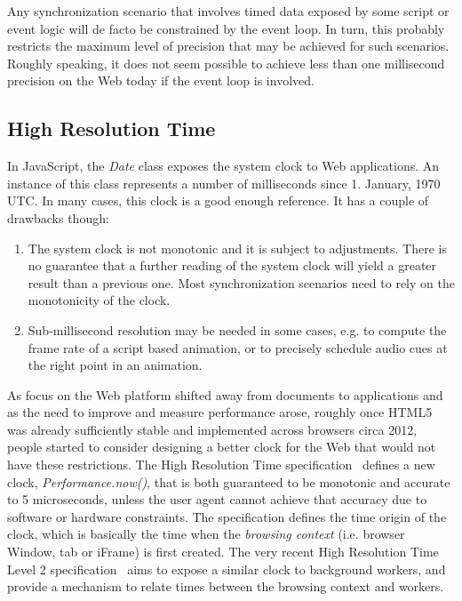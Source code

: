 Any synchronization scenario that involves timed data exposed by some script
or event logic will de facto be constrained by the event loop. In turn, this
probably restricts the maximum level of precision that may be achieved for
such scenarios. Roughly speaking, it does not seem possible to achieve less
than one millisecond precision on the Web today if the event loop is involved.


\subsection{High Resolution Time}
\label{sec:hrt}

In JavaScript, the \emph{Date} class exposes the system clock to Web
applications. An instance of this class represents a number of milliseconds
since 1. January, 1970 UTC. In many cases, this clock is a good enough
reference. It has a couple of drawbacks though:

\begin{enumerate}

\item{

The system clock is not monotonic and it is subject to adjustments. There is
no guarantee that a further reading of the system clock will yield a greater
result than a previous one. Most synchronization scenarios need to rely on the
monotonicity of the clock. 

}
\item {

Sub-millisecond resolution may be needed in some
cases, e.g. to compute the frame rate of a script based animation, or to
precisely schedule audio cues at the right point in an animation.

}

\end{enumerate}

As focus on the Web platform shifted away from documents to applications and
as the need to improve and measure performance arose, roughly once HTML5 was
already sufficiently stable and implemented across browsers circa 2012, people
started to consider designing a better clock for the Web that would not have
these restrictions. The High Resolution Time specification~\cite{hrt1} defines
a new clock, \emph{Performance.now()}, that is both guaranteed to be monotonic
and accurate to 5 microseconds, unless the user agent cannot achieve that
accuracy due to software or hardware constraints. The specification defines
the time origin of the clock, which is basically the time when the
\emph{browsing context} (i.e. browser Window, tab or iFrame) is first created.
The very recent High Resolution Time Level 2 specification~\cite{hrt2} aims to
expose a similar clock to background workers, and provide a mechanism to
relate times between the browsing context and workers.

